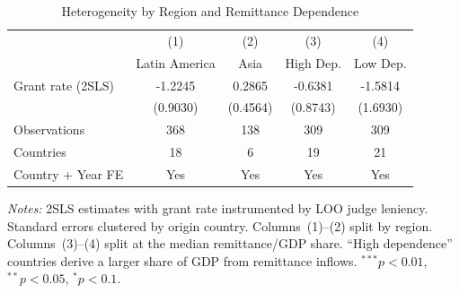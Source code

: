 \begin{table}[!t]
\centering
\caption{Heterogeneity by Region and Remittance Dependence}
\label{tab:heterogeneity}
\begin{threeparttable}
\begin{tabular}{lcccc}
\hline\hline
 & (1) & (2) & (3) & (4) \\
 & Latin America & Asia & High Dep. & Low Dep. \\
\hline
Grant rate (2SLS) & -1.2245 & 0.2865 & -0.6381 & -1.5814 \\
 & (0.9030) & (0.4564) & (0.8743) & (1.6930) \\
\hline
Observations & 368 & 138 & 309 & 309 \\
Countries & 18 & 6 & 19 & 21 \\
Country + Year FE & Yes & Yes & Yes & Yes \\
\hline\hline
\end{tabular}
\begin{tablenotes}[flushleft]
\small
\item \textit{Notes:} 2SLS estimates with grant rate instrumented by LOO judge leniency. Standard errors clustered by origin country. Columns~(1)--(2) split by region. Columns~(3)--(4) split at the median remittance/GDP share. ``High dependence'' countries derive a larger share of GDP from remittance inflows. $^{***}p<0.01$, $^{**}p<0.05$, $^{*}p<0.1$.
\end{tablenotes}
\end{threeparttable}
\end{table}
